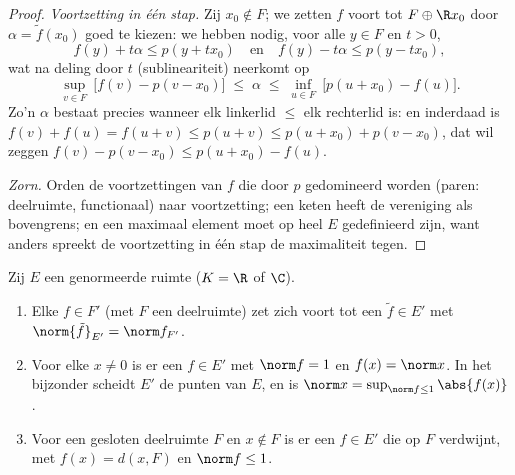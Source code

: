 \begin{proof}
\emph{Voortzetting in één stap.} Zij $x_0 \notin F$; we zetten $f$
voort tot $F \oplus \R x_0$ door $\alpha = \tilde f(x_0)$ goed te
kiezen: we hebben nodig, voor alle $y \in F$ en $t > 0$,
\[
f(y) + t\alpha \leq p(y + tx_0)
\quad\text{en}\quad
f(y) - t\alpha \leq p(y - tx_0),
\]
wat na deling door $t$ (sublineariteit) neerkomt op
\[
\sup_{v \in F}\ \bigl[f(v) - p(v - x_0)\bigr]
\;\leq\; \alpha \;\leq\;
\inf_{u \in F}\ \bigl[p(u + x_0) - f(u)\bigr].
\]
Zo'n $\alpha$ bestaat precies wanneer elk linkerlid $\leq$ elk
rechterlid is: en inderdaad is $f(v) + f(u) = f(u + v) \leq p(u +
v) \leq p(u + x_0) + p(v - x_0)$, dat wil zeggen $f(v) - p(v -
x_0) \leq p(u + x_0) - f(u)$.

\emph{Zorn.} Orden de voortzettingen van $f$ die door $p$
gedomineerd worden (paren: deelruimte, functionaal) naar
voortzetting; een keten heeft de vereniging als bovengrens; en een
maximaal element moet op heel $E$ gedefinieerd zijn, want anders
spreekt de voortzetting in één stap de maximaliteit tegen.
\end{proof}

\begin{corollary}\label{cor:b3:banach:hbnormed}
Zij $E$ een genormeerde ruimte ($K = \R$ of $\C$).
\begin{enumerate}
  \item Elke $f \in F'$ (met $F$ een deelruimte) zet zich voort
        tot een $\tilde f \in E'$ met $\norm{\tilde f}_{E'} =
        \norm f_{F'}$.
  \item Voor elke $x \neq 0$ is er een $f \in E'$ met $\norm f =
        1$ en $f(x) = \norm x$. In het bijzonder scheidt $E'$ de
        punten van $E$, en is $\norm x = \sup_{\norm f \leq
        1}\abs{f(x)}$.
  \item Voor een gesloten deelruimte $F$ en $x \notin F$ is er een
        $f \in E'$ die op $F$ verdwijnt, met $f(x) = d(x, F)$ en
        $\norm f \leq 1$.
\end{enumerate}
\end{corollary}


